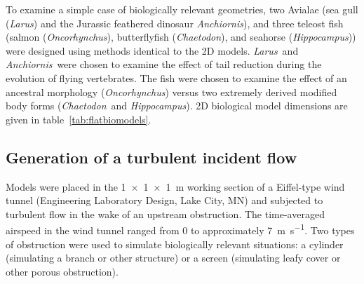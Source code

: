 \documentclass{jfm}
\newcommand{\sixDOF}{6-DOF}
\newcommand{\Genus}[1]{\emph{#1}}
\newcommand{\Larus}{\Genus{Larus}}
\newcommand{\Anchiornis}{\Genus{\dag Anchiornis}}
\newcommand{\Oncorhynchus}{\Genus{Oncorhynchus}}
\newcommand{\Chaetodon}{\Genus{Chaetodon}}
\newcommand{\Hippocampus}{\Genus{Hippocampus}}
\begin{document}

To examine a simple case of biologically relevant geometries, two Avialae (sea gull (\Larus)  and the Jurassic feathered dinosaur \Anchiornis), and three teleost fish (salmon (\Oncorhynchus), butterflyfish (\Chaetodon), and seahorse (\Hippocampus)) were designed using methods identical to the 2D models.  \Larus\ and \Anchiornis\ were chosen to examine the effect of tail reduction during the evolution of flying vertebrates.  The fish were chosen to examine the effect of an ancestral morphology (\Oncorhynchus) versus two extremely derived modified body forms (\Chaetodon\ and \Hippocampus). 2D biological model dimensions are given in table~\ref{tab:flatbiomodels}. 


\subsection{Generation of a turbulent incident flow}
Models were placed in the \SI{1x1x1}{\meter} working section of a Eiffel-type wind tunnel (Engineering Laboratory Design, Lake City, MN) and subjected to turbulent flow in the wake of an upstream obstruction. The time-averaged airspeed in the wind tunnel ranged from 0 to approximately \SI{7}{\meter\per\second}.  Two types of obstruction were used to simulate biologically relevant situations: a cylinder (simulating a branch or other structure) or a screen (simulating leafy cover or other porous obstruction).  

\end{document}
